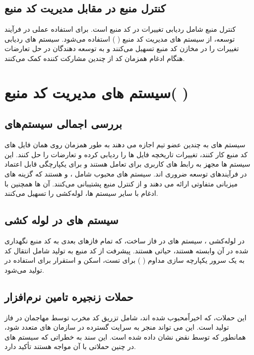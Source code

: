 \documentclass{CSICC}
\begin{document}
\subsection{کنترل منبع در مقابل مدیریت کد منبع}
کنترل منبع شامل ردیابی تغییرات در کد منبع است. برای استفاده عملی در فرآیند توسعه، از سیستم ‌های مدیریت کد منبع (
) استفاده می‌شود. سیستم‌ های 
 ردیابی تغییرات را در مخازن کد منبع تسهیل می‌کنند و به توسعه ‌دهندگان در حل تعارضات هنگام ادغام همزمان کد از چندین مشارکت‌ کننده کمک می‌کنند.

\section{سیستم های مدیریت کد منبع(
)
}
\subsection{بررسی اجمالی سیستم‌های
	 }
سیستم‌ های
  به چندین عضو تیم اجازه می‌ دهند به طور همزمان روی همان فایل‌ های کد منبع کار کنند، تغییرات تاریخچه فایل‌ ها را ردیابی کرده و تعارضات را حل کنند. این سیستم ‌ها مجهز به رابط ‌های کاربری برای تعامل هستند و برای یکپارچگی قابل اعتماد در فرآیندهای توسعه ضروری‌ اند. سیستم‌ های
    محبوب شامل
     ،
       و
         هستند که گزینه‌ های میزبانی متفاوتی ارائه می‌ دهند و از کنترل منبع
           پشتیبانی می‌کنند. آن ‌ها همچنین با ادغام با سایر سیستم‌ ها، لوله‌کشی
             را تسهیل می‌کنند.

\subsection{سیستم ‌های
	  در لوله ‌کشی
	   }


در لوله‌کشی
 ، سیستم‌ های
   در فاز ساخت، که تمام فازهای بعدی به کد منبع نگهداری شده در آن وابسته هستند، حیاتی هستند. پیشرفت از کد منبع به تولید شامل انتقال کد به یک سرور یکپارچه ‌سازی مداوم (
   ) برای تست، اسکن و استقرار برای استفاده در تولید می‌شود.

\subsection{حملات زنجیره تامین نرم‌افزار}

این حملات، که اخیراًمحبوب شده اند، شامل تزریق کد مخرب توسط مهاجمان در فاز تولید است. این می ‌تواند منجر به سرایت گسترده در سازمان‌ های متعدد شود، همانطور که توسط نقض
  نشان داده شده است. این سند به خطراتی که سیستم‌ های
   در چنین حملاتی با آن مواجه هستند تأکید دارد.
\end{document}
